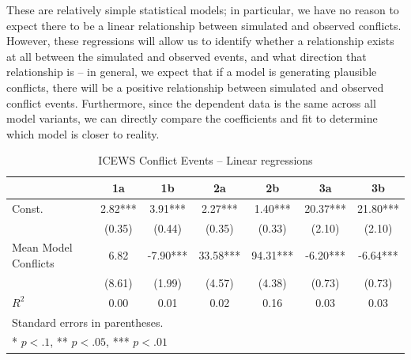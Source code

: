 These are relatively simple statistical models; in particular, we have no reason to expect there to be a linear relationship between simulated and observed conflicts. However, these regressions will allow us to identify whether a relationship exists at all between the simulated and observed events, and what direction that relationship is -- in general, we expect that if a model is generating plausible conflicts, there will be a positive relationship between simulated and observed conflict events. Furthermore, since the dependent data is the same across all model variants, we can directly compare the coefficients and fit to determine which model is closer to reality.


\begin{table}

\begin{center}
    \caption{ICEWS Conflict Events -- Linear regressions}
    \label{table:icews_linear}
\begin{tabular}{lcccccc}
    \hline
                    &    1a   &    1b    &    2a    &    2b    &    3a    &    3b     \\
    \hline

    Const.          & 2.82*** & 3.91***  & 2.27***  & 1.40***  & 20.37*** & 21.80***  \\
                    & (0.35)  & (0.44)   & (0.35)   & (0.33)   & (2.10)   & (2.10)    \\
    Mean Model Conflicts & 6.82    & -7.90*** & 33.58*** & 94.31*** & -6.20*** & -6.64***  \\
                    & (8.61)  & (1.99)   & (4.57)   & (4.38)   & (0.73)   & (0.73)    \\
    \hline
    $R^2$             & 0.00    & 0.01     & 0.02     & 0.16     & 0.03     & 0.03      \\
    \hline
    \hline
    \multicolumn{7}{l}{Standard errors in parentheses.} \\
    \multicolumn{7}{l}{* $p<.1$, ** $p<.05$, *** $p<.01$} \\

    \end{tabular}
    \end{center}
    \tableSpace
\end{table}

